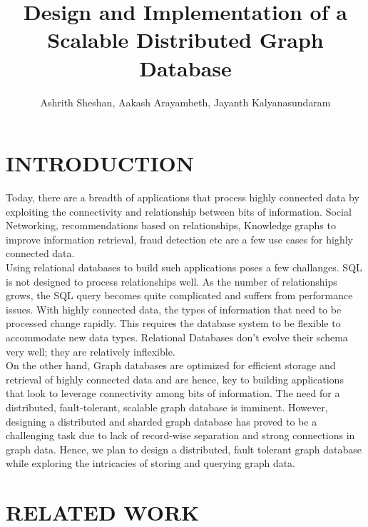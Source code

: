 \documentclass[letterpaper, 11 pt, conference]{ieeeconf}  %
\title{\LARGE \bf
Design and Implementation of a Scalable Distributed Graph Database
}
\author{Ashrith Sheshan, Aakash Arayambeth, Jayanth Kalyanasundaram %
}
\begin{document}
\maketitle
\thispagestyle{empty}
\pagestyle{empty}




\section{INTRODUCTION}
Today, there are a breadth of applications that process highly connected data by exploiting the connectivity and relationship between bits of information. Social Networking, recommendations based on relationships, Knowledge graphs to improve information retrieval, fraud detection etc are a few use cases for highly connected data.\\
 Using relational databases to build such applications poses a few challanges. SQL is not designed to process relationships well. As the number of relationships grows, the SQL query becomes quite complicated and suffers from performance issues. With highly connected data, the types of information that need to be processed change rapidly. This requires the database system to be flexible to accommodate new data types. Relational Databases don't evolve their schema very well; they are relatively inflexible. \\
 On the other hand, Graph databases are optimized for efficient storage and retrieval of highly connected data and are hence, key to building applications that look to leverage connectivity among bits of information. The need for a distributed, fault-tolerant, scalable graph database is imminent. However, designing a distributed and sharded graph database has proved to be a challenging task due to lack of record-wise separation and strong connections in graph data. Hence, we plan to design a distributed, fault tolerant graph database while exploring the intricacies of storing and querying graph data.


\section{RELATED WORK}
  
\end{document}
